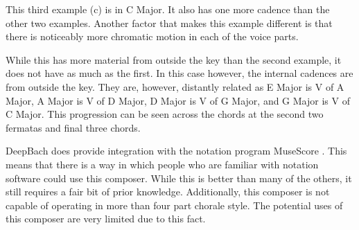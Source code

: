 This third example (c) is in C Major.  It also has one more cadence than the other two examples.  Another factor that makes this example different is that there is noticeably more chromatic motion in each of the voice parts.

\vspace{\baselineskip}

While this has more material from outside the key than the second example, it does not have as much as the first.  In this case however, the internal cadences are from outside the key.  They are, however, distantly related as E Major is V of A Major, A Major is V of D Major, D Major is V of G Major, and G Major is V of C Major.  This progression can be seen across the chords at the second two fermatas and final three chords.

\vspace{\baselineskip}

DeepBach does provide integration with the notation program MuseScore \cite{Hadjeres_2016}.  This means that there is a way in which people who are familiar with notation software could use this composer.  While this is better than many of the others, it still requires a fair bit of prior knowledge.  Additionally, this composer is not capable of operating in more than four part chorale style.  The potential uses of this composer are very limited due to this fact.